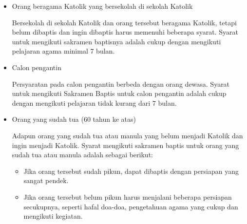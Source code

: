 	\begin{itemize}
		
	
		
		\item  Orang beragama Katolik yang bersekolah di sekolah Katolik
		
		Bersekolah di sekolah Katolik dan orang tersebut beragama Katolik, tetapi belum dibaptis dan ingin dibaptis harus memenuhi beberapa syarat. Syarat untuk mengikuti sakramen baptisnya adalah cukup dengan mengikuti pelajaran agama minimal 7 bulan.
		
		\item Calon pengantin
		
		Persyaratan pada calon pengantin berbeda dengan orang dewasa. Syarat untuk mengikuti Sakramen Baptis untuk calon pengantin adalah cukup dengan mengikuti pelajaran tidak kurang dari 7 bulan.
		\item Orang yang sudah tua (60 tahun ke atas)
		
		Adapun orang yang sudah tua atau manula yang belum menjadi Katolik dan ingin menjadi Katolik. Syarat mengikuti sakramen baptis untuk orang yang sudah tua atau manula adalah sebagai berikut:
		
		\begin{itemize}
			\item Jika orang tersebut sudah pikun, dapat dibaptis dengan persiapan yang sangat pendek.
			\item Jika orang tersebut belum pikun harus menjalani beberapa persiapan secukupnya, seperti hafal doa-doa, pengetahuan agama yang cukup dan mengikuti kegiatan.
		\end{itemize}
		

\end{itemize}
